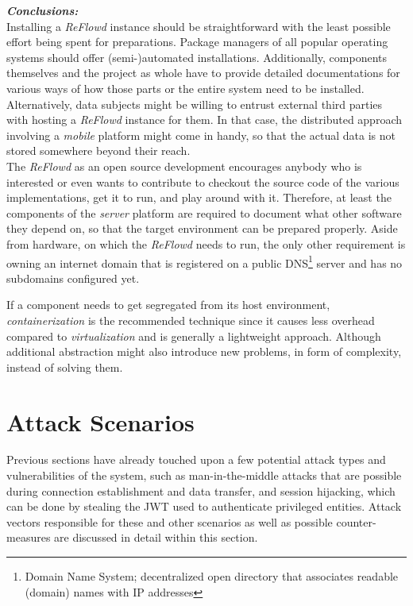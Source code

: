 \documentclass[12pt,english,a4paper,titlepage,cleardoublepage=empty,dottedtoc]{report}
\begin{document}
\newpage

\emph{\textbf{Conclusions:}} ~\\
Installing a \emph{ReFlowd} instance should be straightforward with the
least possible effort being spent for preparations. Package managers of
all popular operating systems should offer (semi-)automated
installations. Additionally, components themselves and the project as
whole have to provide detailed documentations for various ways of how
those parts or the entire system need to be installed. Alternatively,
data subjects might be willing to entrust external third parties with
hosting a \emph{ReFlowd} instance for them. In that case, the
distributed approach involving a \emph{mobile} platform might come in
handy, so that the actual data is not stored somewhere beyond their
reach.\\
The \emph{ReFlowd} as an open source development encourages anybody who
is interested or even wants to contribute to checkout the source code of
the various implementations, get it to run, and play around with it.
Therefore, at least the components of the \emph{server} platform are
required to document what other software they depend on, so that the
target environment can be prepared properly. Aside from hardware, on
which the \emph{ReFlowd} needs to run, the only other requirement is
owning an internet domain that is registered on a public DNS\footnote{Domain
  Name System; decentralized open directory that associates readable
  (domain) names with IP addresses} server and has no subdomains
configured yet.

If a component needs to get segregated from its host environment,
\emph{containerization} is the recommended technique since it causes
less overhead compared to \emph{virtualization} and is generally a
lightweight approach. Although additional abstraction might also
introduce new problems, in form of complexity, instead of solving them.

\section{Attack Scenarios}\label{attack-scenarios}

Previous sections have already touched upon a few potential attack types
and vulnerabilities of the system, such as man-in-the-middle attacks
that are possible during connection establishment and data transfer, and
session hijacking, which can be done by stealing the JWT used to
authenticate privileged entities. Attack vectors responsible for these
and other scenarios as well as possible counter-measures are discussed
in detail within this section.
\end{document}
